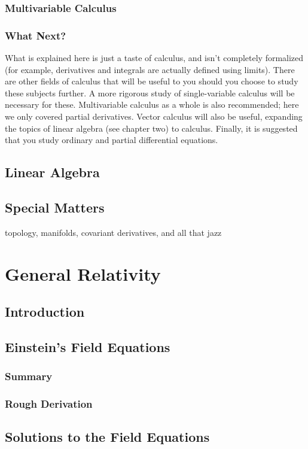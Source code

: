 \documentclass{memoir}
\begin{document}
\section{Multivariable Calculus}

\section{What Next?}
What is explained here is just a taste of calculus, and isn't completely formalized (for example, derivatives and integrals are actually defined using limits). There are other fields of calculus that will be useful to you should you choose to study these subjects further. A more rigorous study of single-variable calculus will be necessary for  these. Multivariable calculus as a whole is also recommended; here we only covered partial derivatives. Vector calculus will also be useful, expanding the topics of linear algebra (see chapter two) to calculus. Finally, it is suggested that you study ordinary and partial differential equations. 
\chapter{Linear Algebra}

\chapter{Special Matters}
topology, manifolds, covariant derivatives, and all that jazz
\part{General Relativity}
\chapter{Introduction}
\chapter{Einstein's Field Equations}
\section{Summary}
\section{Rough Derivation}
\chapter{Solutions to the Field Equations}
\end{document}
